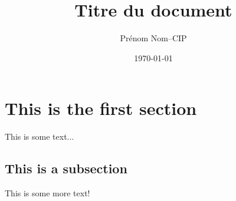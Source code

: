 \documentclass[a11paper, 11pt]{article}
\title{Titre du document}
\author{
  \addtolength{\tabcolsep}{-0.4em}
  \begin{tabular}{rcl} %
  Prénom Nom     & -- & CIP \\
  \end{tabular}
}
\date{\today}
\begin{document}
\maketitle
\newpage
\tableofcontents
\newpage

\section{This is the first section}
This is some text...

\subsection{This is a subsection}
This is some more text!

\end{document}
